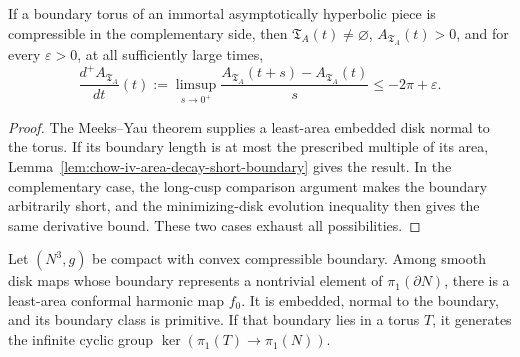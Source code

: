 \begin{proposition}
\label{prop:chow-iv-compressible-torus-area-decay}
If a boundary torus of an immortal asymptotically hyperbolic piece is
compressible in the complementary side, then \(\mathfrak T_A(t)\ne\varnothing\),
\(A_{\mathfrak T_A}(t)>0\), and for every \(\varepsilon>0\), at all sufficiently
large times,
\[
 \frac{d^+A_{\mathfrak T_A}}{dt}(t)
 :=\limsup_{s\to0^+}\frac{A_{\mathfrak T_A}(t+s)-A_{\mathfrak T_A}(t)}s
 \le-2\pi+\varepsilon.
\]
\end{proposition}

\begin{proof}
\sketch
The Meeks--Yau theorem supplies a least-area embedded disk normal to the torus.
If its boundary length is at most the prescribed multiple of its area,
Lemma~\ref{lem:chow-iv-area-decay-short-boundary} gives the result.  In the
complementary case, the long-cusp comparison argument makes the boundary
arbitrarily short, and the minimizing-disk evolution inequality then gives the
same derivative bound.  These two cases exhaust all possibilities.
\end{proof}

\begin{theorem}
\label{thm:chow-iv-meeks-yau}
Let \((N^3,g)\) be compact with convex compressible boundary.  Among smooth
disk maps whose boundary represents a nontrivial element of
\(\pi_1(\partial N)\), there is a least-area conformal harmonic map \(f_0\).
It is embedded, normal to the boundary, and its boundary class is primitive.
If that boundary lies in a torus \(T\), it generates the infinite cyclic group
\(\ker(\pi_1(T)\to\pi_1(N))\).
\end{theorem}

